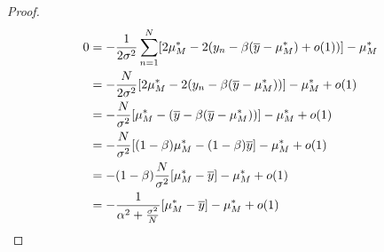 \documentclass[twoside]{article}
\newcommand{\vz}{\mathbf{z}}
\newcommand{\vmu}{\bm{\upmu}}
\newcommand{\vnu}{\bm{\upnu}}
\newcommand{\E}{\mathbb{E}}
\newcommand{\T}{\text{\textsf{T}}}
\newcommand{\opspace}{}
\newcommand{\diag}{\operatorname{diag}\opspace}
\DeclarePairedDelimiter\sbrac{[}{]}              %
\DeclarePairedDelimiter\lra{\langle}{\rangle}    %
\theoremstyle{theoremstyle}
\begin{document}
\begin{proof}
\begin{align}
        0 &= -\frac1{2\sigma^2}\sum_{n=1}^N
        \sbrac*{
            2\mu_M^*
            - 2 (
                y_n
                - \beta ( \overline{y} - \mu_M^*)+o(1)
            )
        } - \mu_M^*\\
        &= -\frac N{2\sigma^2}
        \sbrac*{
            2\mu_M^*
            - 2 (
                y_n
                - \beta ( \overline{y} - \mu_M^*)
            )
        } - \mu_M^*  + o(1)\\
        &= -\frac N{\sigma^2}
        \sbrac*{
            \mu_M^*
            - (
                \overline{y}
                - \beta ( \overline{y} - \mu_M^*)
            )
        } - \mu_M^* + o(1) \\
        &= -\frac N{\sigma^2}
        \sbrac*{
            (1 - \beta) \mu_M^*
            - (1 - \beta) \overline{y}
        } - \mu_M^* + o(1)\\
        &= - (1 - \beta) \frac N{\sigma^2}
        \sbrac*{
            \mu_M^*
            - \overline{y}
        } - \mu_M^* + o(1) \\
        &= - \frac{1}{\alpha^2 + \frac{\sigma^2}{N}}
        \sbrac*{
            \mu_M^*
            - \overline{y}
        } - \mu_M^* + o(1) \\

\end{align}
\end{proof}
\end{document}
